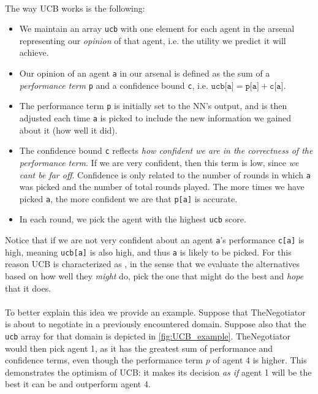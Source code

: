 \paragraph*{}
The way UCB works is the following:
\begin{itemize}
    \item We maintain an array \texttt{ucb} with one element for each agent in the arsenal representing our \emph{opinion} of that agent, i.e. the utility we predict it will achieve.

    \item Our opinion of an agent \texttt{a} in our arsenal is defined as the sum of a \emph{performance term} \texttt{p} and a confidence bound \texttt{c}, i.e. $\texttt{ucb[a]} = \texttt{p[a]} + \texttt{c[a]}$.

    \item The performance term \texttt{p} is initially set to the NN's output, and is then adjusted each time \texttt{a} is picked to include the new information we gained about it (how well it did).
    
    \item The confidence bound \texttt{c} reflects \emph{how confident we are in the correctness of the performance term}. If we are very confident, then this term is low, since \emph{we cant be far off}. Confidence is only related to the number of rounds in which \texttt{a} was picked and the number of total rounds played. The more times we have picked \texttt{a}, the more confident we are that \texttt{p[a]} is accurate.

    \item In each round, we pick the agent with the highest \texttt{ucb} score.
\end{itemize}
Notice that if we are not very confident about an agent \texttt{a}'s performance \texttt{c[a]} is high, meaning \texttt{ucb[a]} is also high, and thus \texttt{a} is likely to be picked. For this reason UCB is characterized as , in the sense that we evaluate the alternatives based on how well they \emph{might} do, pick the one that might do the best and \emph{hope} that it does.

\paragraph*{}
To better explain this idea we provide an example. Suppose that TheNegotiator is about to negotiate in a previously encountered domain. Suppose also that the \texttt{ucb} array for that domain is depicted in \cref{fig:UCB_example}. TheNegotiator would then pick agent 1, as it has the greatest sum of performance and confidence terms, even though the performance term $p$ of agent 4 is higher. This demonstrates the optimism of UCB: it makes its decision \emph{as if} agent 1 will be the best it can be and outperform agent 4.


